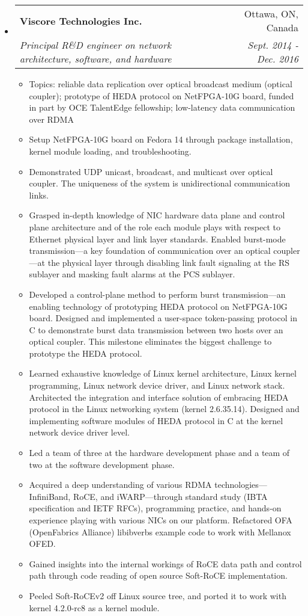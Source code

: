 \documentclass[letterpaper,11pt]{article}
\makeatletter
\newcommand{\ressubheading}[4]{
\begin{tabular*}{6.69in}{l@{\extracolsep{\fill}}r}
        \textbf{#1} & #2 \\
        \textit{#3} & \textit{#4} \\
\end{tabular*}\vspace{-6pt}
}
\newcommand{\resitem}[1]{\item #1 \vspace{-2pt}}
\makeatother
\begin{document}
\begin{itemize}
\item
  \ressubheading{Viscore Technologies Inc.}{Ottawa, ON, Canada}
  {Principal R\&D engineer on network architecture, software, and hardware}{Sept. 2014 - Dec. 2016}
  \begin{itemize}
    \resitem{Topics: reliable data replication over optical broadcast medium (optical coupler); prototype of HEDA protocol on NetFPGA-10G board,
    funded in part by OCE TalentEdge fellowship; low-latency data communication over RDMA}
    \resitem{Setup NetFPGA-10G board on Fedora 14 through package installation, kernel module loading, and troubleshooting.}
    \resitem{Demonstrated UDP unicast, broadcast, and multicast over optical coupler. The uniqueness of the system is unidirectional communication links.}
    \resitem{Grasped in-depth knowledge of NIC hardware data plane and control plane architecture and of the role each module plays
    with respect to Ethernet physical layer and link layer standards.
    Enabled burst-mode transmission---a key foundation of communication over an optical coupler---at the physical layer
    through disabling link fault signaling at the RS sublayer and masking fault alarms at the PCS sublayer.}
    \resitem{Developed a control-plane method to perform burst transmission---an enabling technology of prototyping HEDA protocol on NetFPGA-10G board.
    Designed and implemented a user-space token-passing protocol in C to demonstrate burst data transmission between two hosts over an optical coupler.
    This milestone eliminates the biggest challenge to prototype the HEDA protocol.}
    \resitem{Learned exhaustive knowledge of Linux kernel architecture, Linux kernel programming, Linux network device driver, and Linux network stack.
    Architected the integration and interface solution of embracing HEDA protocol in the Linux networking system (kernel 2.6.35.14).
    Designed and implementing software modules of HEDA protocol in C at the kernel network device driver level.}
    \resitem{Led a team of three at the hardware development phase and a team of two at the software development phase.}
    \resitem{Acquired a deep understanding of various RDMA technologies---InfiniBand, RoCE, and iWARP---through
    standard study (IBTA specification and IETF RFCs), programming practice, and hands-on experience playing with various NICs on our platform.
    Refactored OFA (OpenFabrics Alliance) libibverbs example code to work with Mellanox OFED.}
    \resitem{Gained insights into the internal workings of RoCE data path and control path through code reading of open source Soft-RoCE implementation.}
    \resitem{Peeled Soft-RoCEv2 off Linux source tree, and ported it to work with kernel 4.2.0-rc8 as a kernel module.}
  \end{itemize}



\end{itemize}
\end{document}
